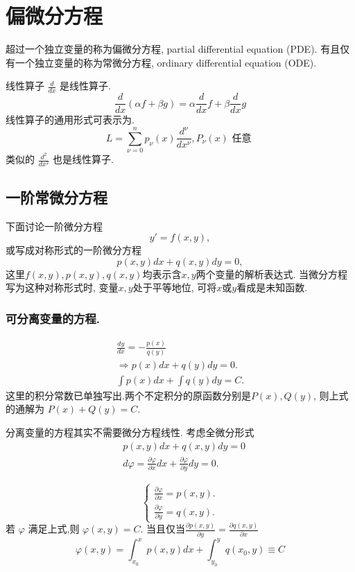 \chapter{偏微分方程}
超过一个独立变量的称为偏微分方程, partial differential equation (PDE). 有且仅有一个独立变量的称为常微分方程, 
ordinary differential equation (ODE).

线性算子
$\frac{d}{d x}$ 是线性算子.
$$
\frac{d}{d x}(\alpha f+\beta g)=\alpha \frac{d}{d x} f +\beta \frac{d}{d x} g
$$
线性算子的通用形式可表示为.
$$
L=\sum_{\nu=0}^n p_\nu(x) \frac{d^\nu}{d x^\nu}, P_\nu(x) \text { 任意 }
$$
类似的 $\frac{d^2}{d x^2}$ 也是线性算子.
\section{一阶常微分方程}
下面讨论一阶微分方程
\begin{equation}
    y' = f(x,y),
\end{equation}
或写成对称形式的一阶微分方程
\begin{equation}
    p(x,y) dx + q(x,y) dy = 0,
\end{equation}
这里$f(x,y), p(x,y), q(x,y)$均表示含$x,y$两个变量的解析表达式. 当微分方程写为这种对称形式时,
变量$x,y$处于平等地位, 可将$x$或$y$看成是未知函数.
\subsection{可分离变量的方程.}
$$
\begin{gathered}
\frac{d y}{d x}=-\frac{p(x)}{q(y)} \\
\Rightarrow p(x) d x+q(y) d y=0 . \\
\int p(x) d x+\int q(y) d y=C .
\end{gathered}
$$
这里的积分常数已单独写出.两个不定积分的原函数分别是$P(x), Q(y)$, 则上式的通解为
$P(x) + Q(y) = C$.

分离变量的方程其实不需要微分方程线性.
考虑全微分形式
$$
\begin{aligned}
& p(x, y) d x+q(x, y) d y=0 \\
& d \varphi=\frac{\partial \varphi}{\partial x} d x+\frac{\partial \varphi}{\partial y} d y=0 .
\end{aligned}
$$

$$
\left\{\begin{array}{l}
\frac{\partial \varphi}{\partial x}=p(x, y) . \\
\frac{\partial \varphi}{\partial y}=q(x, y) .
\end{array}\right.
$$
若 $\varphi$ 满足上式,则 $\varphi(x, y)=C$.
当且仅当$\frac{\partial p(x, y)}{\partial y} = \frac{\partial q(x, y)}{\partial x}$
\begin{equation}
\varphi(x, y)=\int_{x_0}^x p(x, y) d x+\int_{y_0}^y q(x_0, y) \equiv C  
\end{equation}


